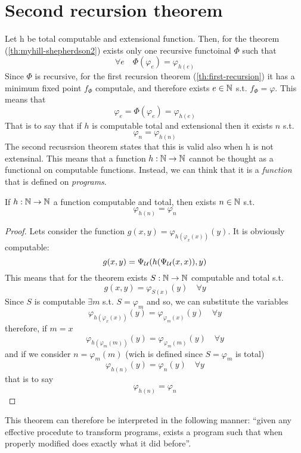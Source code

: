 \chapter{Second recursion theorem}
Let h be total computable and extensional function. Then, for the
theorem (\ref{th:myhill-shepherdson2}) exists only one recursive
functoinal $\Phi$ such that
\[ \forall e \quad \Phi(\varphi_e) = \varphi_{h(e)} \] Since $\Phi$ is
recursive, for the first recursion theorem (\ref{th:first-recursion})
it has a minimum fixed point $f_\Phi$ computale, and therefore exists
$e\in \mathbb{N}$ s.t. $f_\Phi = \varphi$. This means that
\[
  \varphi_e = \Phi(\varphi_e) = \varphi_{h(e)}
\]
That is to say that if $h$ is computable total and extensional then it
exists $n$ s.t. \[\varphi_n = \varphi_{h(n)}\] The second recusrsion
theorem states that this is valid also when h is not extensinal.  This
means that a function $h : \mathbb{N} \rightarrow \mathbb{N}$ cannot be thought as a
functional on computable functions. Instead, we can think that it is a
\emph{function} that is defined on \emph{programs}.

\begin{theorem}\label{th:second-recursion}
  If $h : \mathbb{N} \rightarrow \mathbb{N}$ a function computable and total, then exists
  $n \in \mathbb{N}$ s.t.
  \[
    \varphi_{h(n)} = \varphi_n
  \]
  \begin{proof}
    Lets consider the function
    $g(x,y) = \varphi_{h(\varphi_x(x))}(y)$. It is obviously
    computable:
    \[ g(x,y) = \Psi_{\mathcal{U}}(h(\Psi_{\mathcal{U}}(x,x)), y) \] This means that for the
    \smn theorem exists $S : \mathbb{N} \rightarrow \mathbb{N}$ computable and total s.t.
    \[
      g(x,y) = \varphi_{S(x)}(y) \quad \forall y
    \]
    Since $S$ is computable $\exists m$ s.t. $S = \varphi_m$ and so,
    we can substitute the variables
    \[
      \varphi_{h(\varphi_x(x))}(y) = \varphi_{\varphi_m(x)}(y) \quad \forall y
    \]
    therefore, if $m=x$
    \[
      \varphi_{h(\varphi_m(m))}(y) = \varphi_{\varphi_m(m)}(y) \quad \forall y
    \]
    and if we consider $n = \varphi_m(m)$ (wich is defined since
    $S = \varphi_m$ is total)
    \[
      \varphi_{h(n)}(y)  = \varphi_n(y) \quad \forall y
    \]
    that is to say
    \[
      \varphi_{h(n)} = \varphi_n
    \]
  \end{proof}
\end{theorem}

This theorem can therefore be interpreted in the following manner:
``given any effective procedute to transform programs, exists a
program such that when properly modified does exactly what it did
before''.


